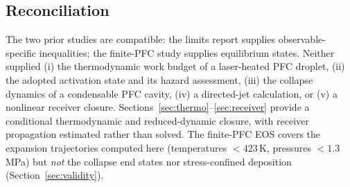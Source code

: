 \subsection{Reconciliation}
The two prior studies are compatible: the limits report supplies observable-specific inequalities;
the finite-PFC study supplies equilibrium states. Neither supplied (i) the thermodynamic work
budget of a laser-heated PFC droplet, (ii) the adopted activation state and its hazard assessment, (iii) the collapse dynamics
of a condensable PFC cavity, (iv) a directed-jet calculation, or (v) a nonlinear receiver closure.
Sections~\ref{sec:thermo}--\ref{sec:receiver} provide a conditional thermodynamic and reduced-dynamic
closure, with receiver propagation estimated rather than solved. The finite-PFC EOS covers the expansion
trajectories computed here (temperatures $<423$\,K, pressures $<1.3$\,MPa) but \emph{not} the collapse
end states nor stress-confined deposition (Section~\ref{sec:validity}).
